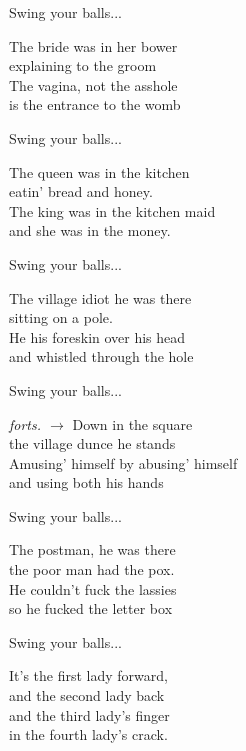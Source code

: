 Swing your balls...\par
\vspace{10pt}
The bride was in her bower\\
explaining to the groom\\
The vagina, not the asshole\\
is the entrance to the womb\par
\vspace{10pt}
Swing your balls...\par
\vspace{10pt}
The queen was in the kitchen\\
eatin' bread and honey.\\
The king was in the kitchen maid\\
and she was in the money.\par
\vspace{10pt}
Swing your balls...\par
\vspace{10pt}
The village idiot he was there\\
sitting on a pole.\\
He his foreskin over his head\\
and whistled through the hole\par
\vspace{10pt}
Swing your balls...\par
\vfill
\hfill {\footnotesize\textit{forts. $\rightarrow$}}
\newpage
Down in the square\\
the village dunce he stands\\
Amusing' himself by abusing' himself\\
and using both his hands\par
\vspace{10pt}
Swing your balls...\par
\vspace{10pt}
The postman, he was there\\
the poor man had the pox.\\
He couldn't fuck the lassies\\
so he fucked the letter box\par
\vspace{10pt}
Swing your balls...\par
\vspace{10pt}
It's the first lady forward,\\
and the second lady back\\
and the third lady's finger\\
in the fourth lady's crack.\par
